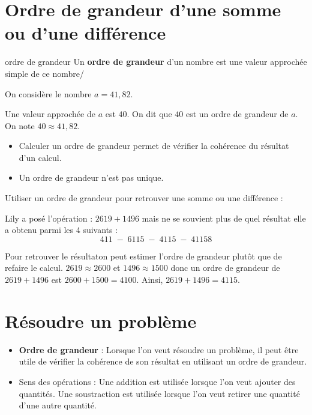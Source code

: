 \begin{pageCours}


\section{Ordre de grandeur d'une somme ou d'une différence}

\begin{DefT}{ordre de grandeur}
Un \textbf{ordre de grandeur} d'un nombre est une valeur approchée simple de ce nombre/
\end{DefT}

\begin{Ex}
On considère le nombre $a=41,82$. 

Une valeur approchée de $a$ est $40$. On dit que $40$ est un ordre de grandeur de $a$. On note $40\approx41,82$.
\end{Ex}

\begin{Rqs}
\begin{itemize}
\item Calculer un ordre de grandeur permet de vérifier la cohérence du résultat d'un calcul.
\item Un ordre de grandeur n'est pas unique.
\end{itemize}
\end{Rqs}

\begin{Mt}
Utiliser un ordre de grandeur pour retrouver une somme ou une différence :

Lily a posé l'opération : $2619+1496$ mais ne se souvient plus de quel résultat elle a obtenu parmi les 4 suivants :
\[411\;-\;6115\;-\;4115\;-\;41158\]

Pour retrouver le résultaton peut estimer l'ordre de grandeur plutôt que de refaire le calcul. $2619\approx2600$ et $1496\approx1500$ donc un ordre de grandeur de $2619+1496$ est $2600+1500=4100$. Ainsi, $2619+1496=4115$.
\end{Mt}

\section{Résoudre un problème}

\begin{Mt}
\begin{itemize}
\item \textbf{Ordre de grandeur} : Lorsque l'on veut résoudre un problème, il peut être utile de vérifier la cohérence de son résultat en utilisant un ordre de grandeur.
\item Sens des opérations : Une addition est utilisée lorsque l'on veut ajouter des quantités. Une soustraction est utilisée lorsque l'on veut retirer une quantité d'une autre quantité.
\end{itemize}
\end{Mt}


\end{pageCours}
